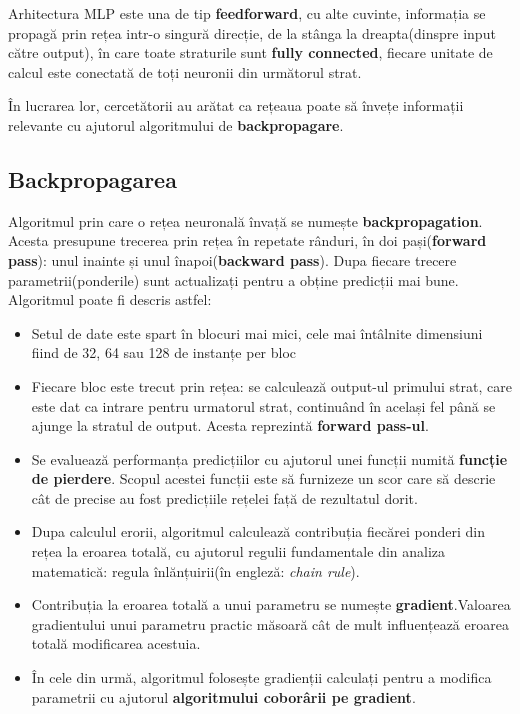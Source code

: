 Arhitectura MLP este una de tip \textbf{feedforward}, cu alte cuvinte, informația se propagă prin rețea intr-o singură direcție, de la stânga la dreapta(dinspre input către output), în care toate straturile sunt \textbf{fully connected}, fiecare unitate de calcul este conectată de toți neuronii din următorul strat. 

În lucrarea lor, cercetătorii au arătat ca rețeaua poate să învețe informații relevante cu ajutorul algoritmului de \textbf{backpropagare}. 
\subsection{Backpropagarea}

Algoritmul prin care o rețea neuronală învață se numește \textbf{backpropagation}. Acesta presupune trecerea prin rețea în repetate rânduri, în doi pași(\textbf{forward pass}): unul inainte și unul înapoi(\textbf{backward pass}). Dupa fiecare trecere parametrii(ponderile) sunt actualizați pentru a obține predicții mai bune.
Algoritmul poate fi descris astfel:
\begin{itemize}
    \item Setul de date este spart în blocuri mai mici, cele mai întâlnite dimensiuni fiind de 32, 64 sau 128 de instanțe per bloc
    \item Fiecare bloc este trecut prin rețea: se calculează output-ul primului strat, care este dat ca intrare pentru urmatorul strat, continuând în același fel până se ajunge la stratul de output. Acesta reprezintă \textbf{forward pass-ul}.
    \item Se evaluează performanța predicțiilor cu ajutorul unei funcții numită \textbf{funcție de pierdere}. Scopul acestei funcții este să furnizeze un scor care să descrie cât de precise au fost predicțiile rețelei față de rezultatul dorit. 
    \item Dupa calculul erorii, algoritmul calculează contribuția fiecărei ponderi din rețea la eroarea totală, cu ajutorul regulii fundamentale din analiza matematică: regula înlănțuirii(în engleză: \textit{chain rule}).
    \item Contribuția la eroarea totală a unui parametru se numește \textbf{gradient}.Valoarea gradientului unui parametru practic măsoară cât de mult influențează eroarea totală modificarea acestuia.
    \item În cele din urmă, algoritmul folosește gradienții calculați pentru a modifica parametrii cu ajutorul \textbf{algoritmului coborârii pe gradient}.
\end{itemize}
\newpage


